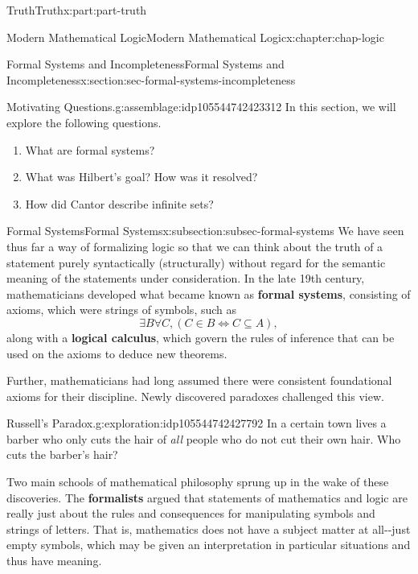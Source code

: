 \documentclass[oneside,10pt,]{book}
\newcommand{\terminology}[1]{\textbf{#1}}
\numberwithin{equation}{section}
\begin{document}
\begin{partptx}{Truth}{}{Truth}{}{}{x:part:part-truth}
\begin{chapterptx}{Modern Mathematical Logic}{}{Modern Mathematical Logic}{}{}{x:chapter:chap-logic}
\typeout{************************************************}
%
\begin{sectionptx}{Formal Systems and Incompleteness}{}{Formal Systems and Incompleteness}{}{}{x:section:sec-formal-systems-incompleteness}
\begin{assemblage}{Motivating Questions.}{g:assemblage:idp105544742423312}%
In this section, we will explore the following questions. %
\begin{enumerate}
\item{}What are formal systems?%
\item{}What was Hilbert's goal? How was it resolved?%
\item{}How did Cantor describe infinite sets?%
\end{enumerate}
%
\end{assemblage}
%
%
\typeout{************************************************}
\typeout{************************************************}
%
\begin{subsectionptx}{Formal Systems}{}{Formal Systems}{}{}{x:subsection:subsec-formal-systems}
We have seen thus far a way of formalizing logic so that we can think about the truth of a statement purely syntactically (structurally) without regard for the semantic meaning of the statements under consideration. In the late 19th century, mathematicians developed what became known as \terminology{formal systems}, consisting of axioms, which were strings of symbols, such as%
\begin{equation*}
\exists B \forall C, (C\in B \Leftrightarrow C\subseteq A),
\end{equation*}
along with a \terminology{logical calculus}, which govern the rules of inference that can be used on the axioms to deduce new theorems.%
\par
Further, mathematicians had long assumed there were consistent foundational axioms for their discipline. Newly discovered paradoxes challenged this view.%
\begin{exploration}{Russell's Paradox.}{g:exploration:idp105544742427792}%
In a certain town lives a barber who only cuts the hair of \emph{all} people who do not cut their own hair. Who cuts the barber's hair?%
\end{exploration}%
Two main schools of mathematical philosophy sprung up in the wake of these discoveries. The \terminology{formalists} argued that statements of mathematics and logic are really just about the rules and consequences for manipulating symbols and strings of letters. That is, mathematics does not have a subject matter at all-{}-{}just empty symbols, which may be given an interpretation in particular situations and thus have meaning.%

\end{subsectionptx}
\end{sectionptx}
\end{chapterptx}
\end{partptx}
\end{document}

